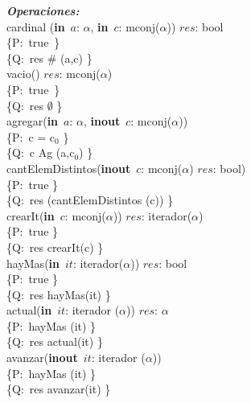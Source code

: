 \documentclass[a4paper,10pt]{article}
\begin{document}
\noindent \textbf{\textsl{Operaciones:}}\\

\noindent cardinal (\textbf{in}\ $a$: $\alpha$, \textbf{in}\ $c$: mconj($\alpha$))  \en $res$: bool \ \ \ \ \ \\
\indent \{P:\ true\ \}  \\
\indent \{Q:\ res \igobs $\#$ (a,c) \}\\

\noindent vacio()  \en $res$: mconj($\alpha$) \ \ \ \ \ \\
\indent \{P:\ true\ \}  \\
\indent \{Q:\ res \igobs $\emptyset$ \}\\

\noindent agregar(\textbf{in}\ $a$: $\alpha$, \textbf{inout}\ $c$: mconj($\alpha$))  \ \ \ \ \ \\
\indent \{P:\ c = c$_0$ \}  \\
\indent \{Q:\ c \igobs Ag (a,c$_0$) \}\\

\noindent cantElemDistintos(\textbf{inout}\ $c$: mconj($\alpha$) \en $res$: bool)  \ \ \ \ \ \\
\indent \{P:\ true \}  \\
\indent \{Q:\ res \igobs (cantElemDistintos (c)) \}\\

\noindent crearIt(\textbf{in}\ $c$: mconj($\alpha$))  \en $res$: iterador($\alpha$) \ \ \ \ \ \\
\indent \{P:\ true \}  \\
\indent \{Q:\ res \igobs crearIt(c) \}\\

\noindent hayMas(\textbf{in}\ $it$: iterador($\alpha$))  \en $res$: bool \ \ \ \ \ \\
\indent \{P:\ true \}  \\
\indent \{Q:\ res \igobs hayMas(it) \}\\

\noindent actual(\textbf{in}\ $it$: iterador ($\alpha$))  \en $res$: $\alpha$ \ \ \ \ \ \\
\indent \{P:\ hayMas (it) \}  \\
\indent \{Q:\ res \igobs actual(it) \}\\

\noindent avanzar(\textbf{inout}\ $it$: iterador ($\alpha$)) \ \ \ \ \ \\
\indent \{P:\ hayMas (it) \}  \\
\indent \{Q:\ res \igobs avanzar(it) \}\\
\end{document}

